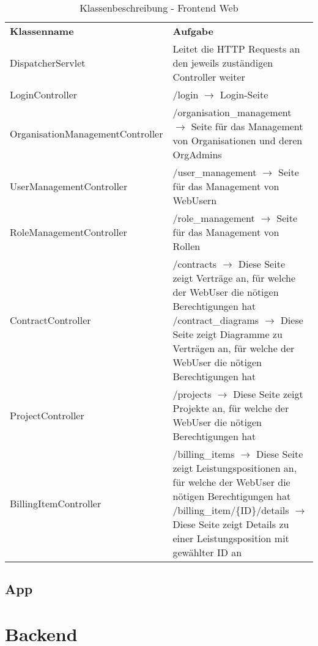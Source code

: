 \begin{table}[h]
	\centering
	\begin{tabularx}{\textwidth}{X X}
		\rowcolor[HTML]{C0C0C0} 
		\textbf{Klassenname} & \textbf{Aufgabe} \\
		DispatcherServlet & Leitet die HTTP Requests an den jeweils zuständigen Controller weiter \\
		\rowcolor[HTML]{E7E7E7} 
		LoginController & /login $\rightarrow$ Login-Seite \\
		OrganisationManagementController & /organisation\_management $\rightarrow$ Seite für das Management von Organisationen und deren OrgAdmins \\
		\rowcolor[HTML]{E7E7E7} 
		UserManagementController & /user\_management $\rightarrow$ Seite für das Management von WebUsern \\
		RoleManagementController & /role\_management $\rightarrow$ Seite für das Management von Rollen \\
		\rowcolor[HTML]{E7E7E7} 
		ContractController & /contracts $\rightarrow$ Diese Seite zeigt Verträge an, für welche der WebUser die nötigen Berechtigungen hat \newline
		/contract\_diagrams $\rightarrow$ Diese Seite zeigt Diagramme zu Verträgen an, für welche der WebUser die nötigen Berechtigungen hat \\
		ProjectController & /projects $\rightarrow$ Diese Seite zeigt Projekte an, für welche der WebUser die nötigen Berechtigungen hat \\
		\rowcolor[HTML]{E7E7E7} 
		BillingItemController & /billing\_items $\rightarrow$ Diese Seite zeigt Leistungspositionen an, für welche der WebUser die nötigen Berechtigungen hat \newline
		/billing\_item/\{ID\}/details $\rightarrow$ Diese Seite zeigt Details zu einer Leistungsposition mit gewählter ID an
	\end{tabularx}
	\caption{Klassenbeschreibung - Frontend Web}
	\label{table:klassenbeschreibung-web}
\end{table}

\clearpage

\subsection{App}

\section{Backend}
